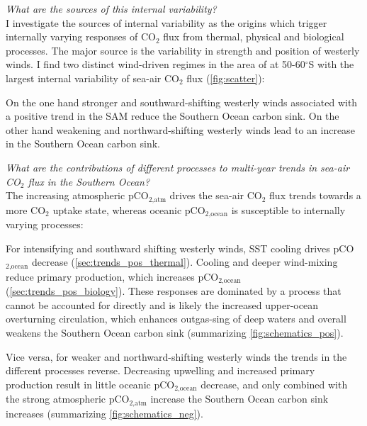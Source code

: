 \textit{What are the sources of this internal variability?}\\

I investigate the sources of internal variability as the origins which trigger internally varying responses of CO$_2$ flux from thermal, physical and biological processes. The major source is the variability in strength and position of westerly winds. I find two distinct wind-driven regimes in the area of at 50-60$^\circ$S with the largest internal variability of sea-air CO$_2$ flux (\autoref{fig:scatter}): 

On the one hand stronger and southward-shifting westerly winds associated with a positive trend in the \acf{SAM} reduce the Southern Ocean carbon sink. On the other hand weakening and northward-shifting westerly winds lead to an increase in the Southern Ocean carbon sink.\newline

\textit{What are the contributions of different processes to multi-year trends in sea-air CO$_2$ flux in the Southern Ocean?}\\

The increasing atmospheric pCO$_{\text{2,atm}}$ drives the sea-air CO$_2$ flux trends towards a more CO$_2$ uptake state, whereas oceanic pCO$_{\text{2,ocean}}$ is susceptible to internally varying processes:

For intensifying and southward shifting westerly winds, \acf{SST} cooling drives pCO$_{\text{2,ocean}}$ decrease (\autoref{sec:trends_pos_thermal}). Cooling and deeper wind-mixing reduce primary production, which increases pCO$_{\text{2,ocean}}$ (\autoref{sec:trends_pos_biology}). These responses are dominated by a process that cannot be accounted for directly and is likely the increased upper-ocean overturning circulation, which enhances outgas-sing of deep waters and overall weakens the Southern Ocean carbon sink (summarizing \autoref{fig:schematics_pos}). %

Vice versa, for weaker and northward-shifting westerly winds the trends in the different processes reverse. Decreasing upwelling and increased primary production result in little oceanic pCO$_{\text{2,ocean}}$ decrease, and only combined with the strong atmospheric pCO$_{\text{2,atm}}$ increase the Southern Ocean carbon sink increases (summarizing \autoref{fig:schematics_neg}).\newline %

